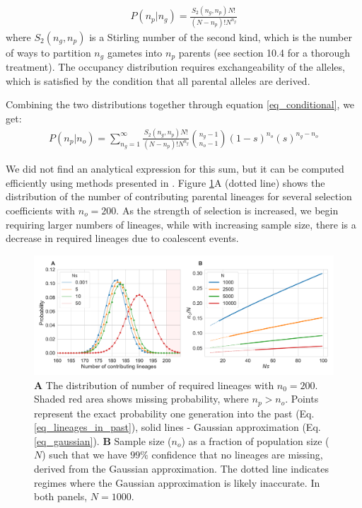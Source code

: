 \documentclass[review]{elsarticle}
\begin{document}
\begin{equation}
  \begin{aligned}
    \label{eq_occupancy}
    P(n_p|n_g) = \frac{S_2(n_g,n_p) N!}{(N-n_p)! N^{n_g}}
  \end{aligned}
\end{equation}
where $S_2(n_g,n_p)$ is a Stirling number of the second kind, which is the number of ways to
partition $n_g$ gametes into $n_p$ parents (see \cite{JohnsonEtAl2005} section 10.4 for a thorough
treatment).
The occupancy distribution requires exchangeability of the alleles, which is satisfied by the 
condition that all parental alleles are derived. 

Combining the two distributions together through equation \ref{eq_conditional}, we get:
\begin{equation}
  \begin{aligned}
    \label{eq_lineages_in_past}
    P(n_p|n_o) = \sum_{n_g=1}^{\infty} \frac{S_2(n_g,n_p) N!}{(N-n_p)! N^{n_g}} \binom{n_g-1}{n_o-1}(1-s)^{n_o}(s)^{n_g-n_o}
  \end{aligned}
\end{equation}

We did not find an analytical expression for this sum, but it can be computed
efficiently using methods presented in \citep{ONeill2019}. Figure \ref{fig_combined}A (dotted line) shows
the distribution of the number of contributing parental lineages for several selection coefficients
with $n_o=200$.
As the strength of selection
is increased, we begin requiring larger numbers of lineages, while with increasing sample size,
there is a decrease in required lineages due to coalescent events.

\begin{figure}
  \centering
  \includegraphics[width=\textwidth]{fig/combined.pdf}
  \caption{\textbf{A} The distribution of number of required lineages with $n_0=200$. Shaded
    red area shows missing probability, where $n_p > n_o$. Points represent the exact probability one
    generation into the past (Eq. \ref{eq_lineages_in_past}), solid lines - Gaussian approximation
    (Eq. \ref{eq_gaussian}). \textbf{B} Sample size ($n_o$) as a fraction of population size ($N$)
    such that we have $99\%$ confidence that no lineages are missing, derived from the Gaussian
    approximation. The dotted line indicates regimes where the Gaussian approximation is likely inaccurate. 
     In both panels, $N=1000$.}
  \label{fig_combined}
\end{figure}
\end{document}
